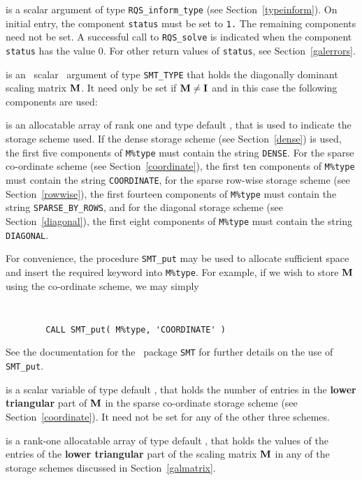 \documentclass{galahad}
\newcommand{\packagename}{RQS}
\begin{document}
\begin{description}
 is a scalar \intentinout argument of type
{\tt \packagename\_inform\_type}
(see Section~\ref{typeinform}).
On initial entry, the component {\tt status} must be set to {\tt 1.}
The remaining components need not be set.
A successful call to
{\tt \packagename\_solve}
is indicated when the  component {\tt status} has the value 0.
For other return values of {\tt status}, see Section~\ref{galerrors}.

 is an \optional\ scalar \intentin\ argument of type {\tt SMT\_TYPE}
that holds the diagonally dominant scaling matrix ${\mathbf{M}}$. It need only be set
if ${\mathbf{M}} \neq {\mathbf{I}}$ and in this case the following components are used:

\begin{description}

 is an allocatable array of rank one and type default
\character, that
is used to indicate the storage scheme used. If the dense storage scheme
(see Section~\ref{dense}) is used,
the first five components of {\tt M\%type} must contain the
string {\tt DENSE}.
For the sparse co-ordinate scheme (see Section~\ref{coordinate}),
the first ten components of {\tt M\%type} must contain the
string {\tt COORDINATE},
for the sparse row-wise storage scheme (see Section~\ref{rowwise}),
the first fourteen components of {\tt M\%type} must contain the
string {\tt SPARSE\_BY\_ROWS},
and for the diagonal storage scheme (see Section~\ref{diagonal}),
the first eight components of {\tt M\%type} must contain the
string {\tt DIAGONAL}.

For convenience, the procedure {\tt SMT\_put}
may be used to allocate sufficient space and insert the required keyword
into {\tt M\%type}.
For example, if we wish to store ${\mathbf{M}}$ using the co-ordinate scheme,
we may simply
{\tt
\begin{verbatim}
        CALL SMT_put( M%type, 'COORDINATE' )
\end{verbatim}
}
\noindent
See the documentation for the \galahad\ package {\tt SMT}
for further details on the use of {\tt SMT\_put}.

 is a scalar variable of type default \integer, that
holds the number of entries in the {\bf lower triangular} part of ${\mathbf{M}}$
in the sparse co-ordinate storage scheme (see Section~\ref{coordinate}).
It need not be set for any of the other three schemes.

 is a rank-one allocatable array of type default \realdp, that holds
the values of the entries of the {\bf lower triangular} part
of the scaling matrix ${\mathbf{M}}$ in any of the
storage schemes discussed in Section~\ref{galmatrix}.


\end{description}
\end{description}
\end{document}
